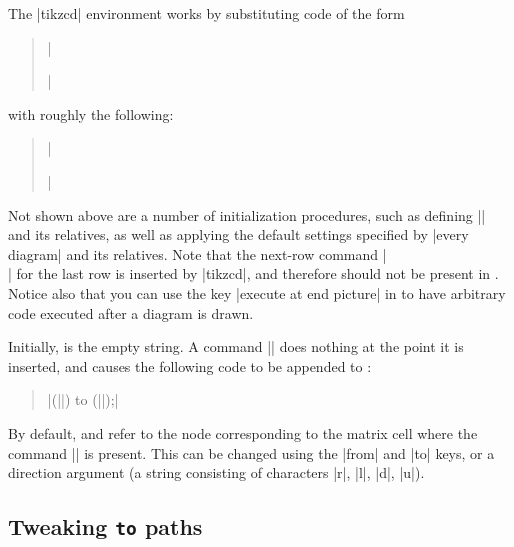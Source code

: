\documentclass[a4paper]{ltxdoc}
\begin{document}
The |{tikzcd}| environment works by substituting code of the form
\begin{verse}
  ||
\end{verse}
with roughly the following:
\begin{verse}
  ||
\end{verse}

Not shown above are a number of initialization procedures, such as
defining |\arrow| and its relatives, as well as applying the default
settings specified by |every diagram| and its relatives.  Note that
the next-row command |\\| for the last row is inserted by |{tikzcd}|,
and therefore should not be present in .  Notice also
that you can use the key |execute at end picture| in 
to have arbitrary \tikzname{} code executed after a diagram is drawn.

Initially,  is the empty string.  A command
|| does nothing at the point it is inserted,
and causes the following code to be appended to :
\begin{verse}
  | (||) to (||);|
\end{verse}
By default,  and  refer to the
node corresponding to the matrix cell where the command |\arrow| is
present.  This can be changed using the |from| and |to| keys, or a
direction argument (a string consisting of characters |r|, |l|, |d|,
|u|).

\subsection{Tweaking \texttt{to} paths}
\label{sec:tweaking-to-paths}
\end{document}
